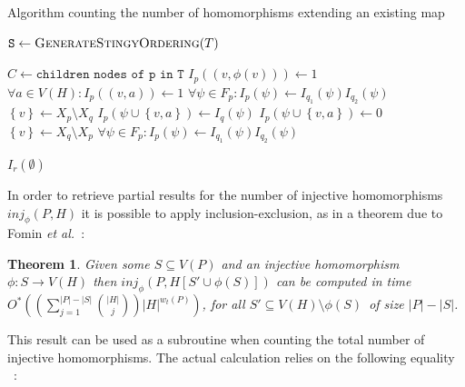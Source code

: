 \documentclass[a4paper,11pt]{report}
\theoremstyle{plain}
\newtheorem{thm}{Theorem}[chapter] %
\theoremstyle{definition}
\begin{document}
\begin{algorithm}
\begin{algorithmic}
\caption{Algorithm counting the number of homomorphisms extending an existing map}
\label{count-homomorphisms}

\State $\texttt{S} \gets \Call{GenerateStingyOrdering}{T}$

  \State $C \gets \texttt{children nodes of p in T}$
        \State $I_p((v, \phi(v))) \gets 1$
    \Else
        \State $\forall a \in V(H): I_p((v, a)) \gets 1$
    \EndIf
      \State $\forall \psi \in F_p: I_p(\psi) \gets I_{q_1}(\psi) I_{q_2}(\psi)$
      \State $\left\{v\right\}\gets X_p \setminus X_q$
            \State $I_p(\psi \cup \left\{v, a \right\}) \gets I_q(\psi)$
        \Else
            \State $I_p(\psi \cup \left\{v, a \right\}) \gets 0$
        \EndIf
      \EndFor
      \State $\left\{v\right\}\gets X_q \setminus X_p$
      \State $\forall \psi \in F_p: I_p(\psi) \gets I_{q_1}(\psi) I_{q_2}(\psi)$
  \EndIf
\EndFor

\Return $I_r(\emptyset)$
\EndProcedure
\end{algorithmic}
\end{algorithm}

In order to retrieve partial results for the number of injective homomorphisms $inj_{\phi}(P, H)$ it is possible to apply inclusion-exclusion, as in a theorem due to Fomin \emph{et al.}~\cite{FLRRS12}:

\begin{thm}
\label{thm:fomin}
Given some $S \subseteq V(P)$ and an injective homomorphism $\phi : S \rightarrow V(H)$ then $inj_{\phi}(P, H[S' \cup \phi(S)])$
can be computed in time $O^*((\sum_{j=1}^{|P|-|S|}\binom{|H|}{j})|H|^{w_t(P)})$,
for all $S' \subseteq V(H) \setminus \phi(S)$ of size $|P| - |S|$.
\end{thm}

This result can be used as a subroutine when counting the total number of injective homomorphisms.
The actual calculation relies on the following equality ~\cite{FLRRS12}:
\end{document}
